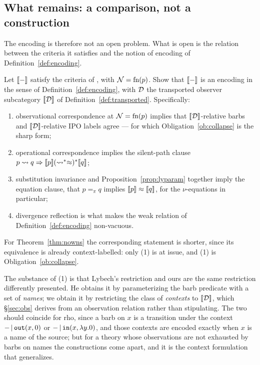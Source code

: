 \documentclass{article}
\begin{document}
\subsection{What remains: a comparison, not a construction}

The encoding is therefore not an open problem. What is open is the relation between the criteria it satisfies and the notion of encoding of Definition~\ref{def:encoding}.

\begin{obligation}
\label{ob:compare}
    Let $[\![-]\!]$ satisfy the criteria of \citet{lybech}, with $\mathcal{N}=\mathrm{fn}(p)$. Show that $[\![-]\!]$ is an encoding in the sense of Definition~\ref{def:encoding}, with $\mathcal{D}$ the transported observer subcategory $[\![\mathcal{D}]\!]$ of Definition~\ref{def:transported}. Specifically:
    \begin{enumerate}
        \item observational correspondence at $\mathcal{N}=\mathrm{fn}(p)$ implies that $[\![\mathcal{D}]\!]$-relative barbs and $[\![\mathcal{D}]\!]$-relative IPO labels agree --- for which Obligation~\ref{ob:collapse} is the sharp form;
        \item operational correspondence implies the silent-path clause $p\rightsquigarrow q \Rightarrow [\![p]\!](\rightsquigarrow^\ast\approx)^\ast[\![q]\!]$;
        \item substitution invariance and Proposition~\ref{prop:lyparam} together imply the equation clause, that $p=_\pi q$ implies $[\![p]\!]\approx[\![q]\!]$, for the $\nu$-equations in particular;
        \item divergence reflection is what makes the weak relation of Definition~\ref{def:encoding} non-vacuous.
    \end{enumerate}
    For Theorem~\ref{thm:nowns} the corresponding statement is shorter, since its equivalence is already context-labelled: only (1) is at issue, and (1) is Obligation~\ref{ob:collapse}.
\end{obligation}

The substance of (1) is that Lybech's restriction and ours are the same restriction differently presented. He obtains it by parameterizing the barb predicate with a set of \emph{names}; we obtain it by restricting the class of \emph{contexts} to $[\![\mathcal{D}]\!]$, which \S\ref{sec:obs} derives from an observation relation rather than stipulating. The two should coincide for rho, since a barb on $x$ is a transition under the context $-\,|\,\mathtt{out}(x,0)$ or $-\,|\,\mathtt{in}(x,\lambda y.0)$, and those contexts are encoded exactly when $x$ is a name of the source; but for a theory whose observations are not exhausted by barbs on names the constructions come apart, and it is the context formulation that generalizes.
\end{document}
